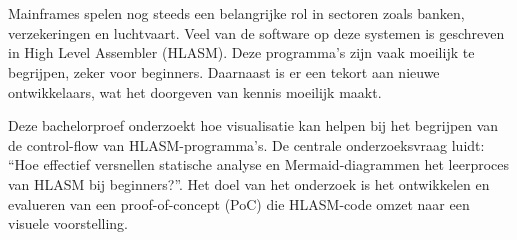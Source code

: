 
%
%
%
%
%

%


\chapter*{}

Mainframes spelen nog steeds een belangrijke rol in sectoren zoals banken, verzekeringen en luchtvaart. Veel van de software op deze systemen is geschreven in High Level Assembler (HLASM). Deze programma’s zijn vaak moeilijk te begrijpen, zeker voor beginners. Daarnaast is er een tekort aan nieuwe ontwikkelaars, wat het doorgeven van kennis moeilijk maakt.

Deze bachelorproef onderzoekt hoe visualisatie kan helpen bij het begrijpen van de control-flow van HLASM-programma’s. De centrale onderzoeksvraag luidt: “Hoe effectief versnellen statische analyse en Mermaid-diagrammen het leerproces van HLASM bij beginners?”. Het doel van het onderzoek is het ontwikkelen en evalueren van een proof-of-concept (PoC) die HLASM-code omzet naar een visuele voorstelling.

